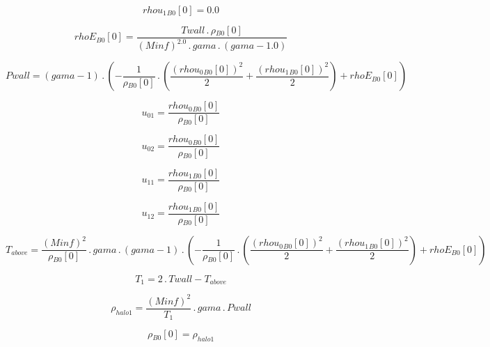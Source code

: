\documentclass{article}
\begin{document}
\begin{dmath}{rhou_{1}{_{B0}}}[{0}] = 0.0\end{dmath}

\begin{dmath}{rhoE{_{B0}}}[{0}] = \frac{Twall \,.\, {\rho{_{B0}}}[{0}]}{\left(Minf \right)^{2.0} \,.\, gama \,.\, \left(gama - 1.0\right)}\end{dmath}

\begin{dmath}Pwall = \left(gama - 1\right) \,.\, \left(- \frac{1}{{\rho{_{B0}}}[{0}]} \,.\, \left(\frac{\left({rhou_{0}{_{B0}}}[{0}] \right)^{2}}{2} + \frac{\left({rhou_{1}{_{B0}}}[{0}] \right)^{2}}{2}\right) + {rhoE{_{B0}}}[{0}]\right)\end{dmath}

\begin{dmath}u_{01} = \frac{{rhou_{0}{_{B0}}}[{0}]}{{\rho{_{B0}}}[{0}]}\end{dmath}

\begin{dmath}u_{02} = \frac{{rhou_{0}{_{B0}}}[{0}]}{{\rho{_{B0}}}[{0}]}\end{dmath}

\begin{dmath}u_{11} = \frac{{rhou_{1}{_{B0}}}[{0}]}{{\rho{_{B0}}}[{0}]}\end{dmath}

\begin{dmath}u_{12} = \frac{{rhou_{1}{_{B0}}}[{0}]}{{\rho{_{B0}}}[{0}]}\end{dmath}

\begin{dmath}T_{above} = \frac{\left(Minf \right)^{2}}{{\rho{_{B0}}}[{0}]} \,.\, gama \,.\, \left(gama - 1\right) \,.\, \left(- \frac{1}{{\rho{_{B0}}}[{0}]} \,.\, \left(\frac{\left({rhou_{0}{_{B0}}}[{0}] \right)^{2}}{2} + 
\frac{\left({rhou_{1}{_{B0}}}[{0}] \right)^{2}}{2}\right) + {rhoE{_{B0}}}[{0}]\right)\end{dmath}

\begin{dmath}T_{1} = 2 \,.\, Twall - T_{above}\end{dmath}

\begin{dmath}\rho_{halo 1} = \frac{\left(Minf \right)^{2}}{T_{1}} \,.\, gama \,.\, Pwall\end{dmath}

\begin{dmath}{\rho{_{B0}}}[{0}] = \rho_{halo 1}\end{dmath}
\end{document}
